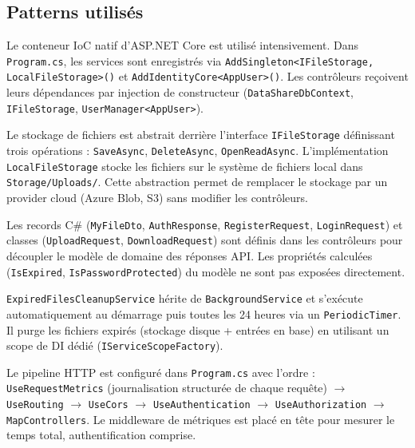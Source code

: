\documentclass[12pt,a4paper]{article}
\begin{document}
\subsection{Patterns utilis\'es}

\begin{description}[style=nextline]
  \item[Dependency Injection (DI)]
    Le conteneur IoC natif d'ASP.NET Core est utilis\'e intensivement. Dans \texttt{Program.cs}, les services sont enregistr\'es via \texttt{AddSingleton<IFileStorage, LocalFileStorage>()} et \texttt{AddIdentityCore<AppUser>()}. Les contr\^oleurs re\c{c}oivent leurs d\'ependances par injection de constructeur (\texttt{DataShareDbContext}, \texttt{IFileStorage}, \texttt{UserManager<AppUser>}).

  \item[Interface Segregation (IFileStorage)]
    Le stockage de fichiers est abstrait derri\`ere l'interface \texttt{IFileStorage} d\'efinissant trois op\'erations : \texttt{SaveAsync}, \texttt{DeleteAsync}, \texttt{OpenReadAsync}. L'impl\'ementation \texttt{LocalFileStorage} stocke les fichiers sur le syst\`eme de fichiers local dans \texttt{Storage/Uploads/}. Cette abstraction permet de remplacer le stockage par un provider cloud (Azure Blob, S3) sans modifier les contr\^oleurs.

  \item[DTOs (Data Transfer Objects)]
    Les records C\# (\texttt{MyFileDto}, \texttt{AuthResponse}, \texttt{RegisterRequest}, \texttt{LoginRequest}) et classes (\texttt{UploadRequest}, \texttt{DownloadRequest}) sont d\'efinis dans les contr\^oleurs pour d\'ecoupler le mod\`ele de domaine des r\'eponses API. Les propri\'et\'es calcul\'ees (\texttt{IsExpired}, \texttt{IsPasswordProtected}) du mod\`ele ne sont pas expos\'ees directement.

  \item[Background Service]
    \texttt{ExpiredFilesCleanupService} h\'erite de \texttt{BackgroundService} et s'ex\'ecute automatiquement au d\'emarrage puis toutes les 24 heures via un \texttt{PeriodicTimer}. Il purge les fichiers expir\'es (stockage disque + entr\'ees en base) en utilisant un scope de DI d\'edi\'e (\texttt{IServiceScopeFactory}).

  \item[Middleware Pipeline]
    Le pipeline HTTP est configur\'e dans \texttt{Program.cs} avec l'ordre : \texttt{UseRequestMetrics} (journalisation structur\'ee de chaque requ\^ete) $\rightarrow$ \texttt{UseRouting} $\rightarrow$ \texttt{UseCors} $\rightarrow$ \texttt{UseAuthentication} $\rightarrow$ \texttt{UseAuthorization} $\rightarrow$ \texttt{MapControllers}. Le middleware de m\'etriques est plac\'e en t\^ete pour mesurer le temps total, authentification comprise.
\end{description}
\end{document}
